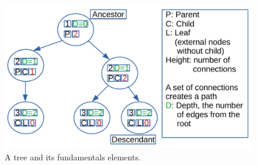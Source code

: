 \begin{figure}[H]
	\begin{center}
		\includegraphics[scale=.6]{chapters/trees/images/trees_3.pdf}
		\caption[A tree and its fundamentals elements.]{A tree and its fundamentals elements.}
		\label{trees_3}
	\end{center}
\end{figure}

